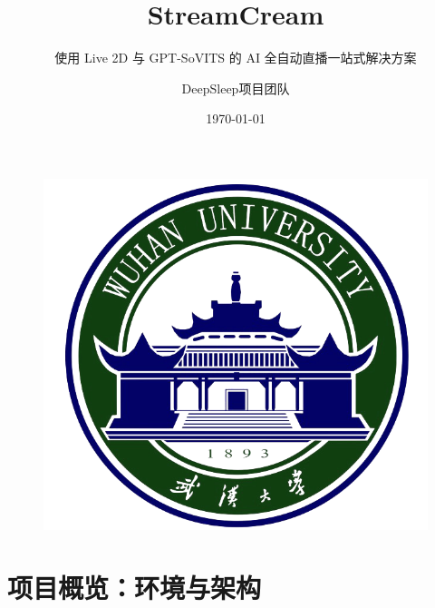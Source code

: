 \documentclass{beamer}
\author{DeepSleep项目团队}
\title{\huge StreamCream}
\subtitle{\scriptsize  使用 Live 2D 与 GPT-SoVITS 的 AI 全自动直播一站式解决方案}
\institute{武汉大学计算机科学院}
\date{\today}
\begin{document}
\begin{frame}
    \titlepage
    \begin{figure}[htpb]
        \begin{center}
            \includegraphics[width=0.2\linewidth]{pic/whulogo.png}
        \end{center}
    \end{figure}
\end{frame}

\begin{frame}
    \tableofcontents[sectionstyle=show,subsectionstyle=show/shaded/hide,subsubsectionstyle=show/shaded/hide]
\end{frame}




\section{项目概览：环境与架构}
\end{document}
